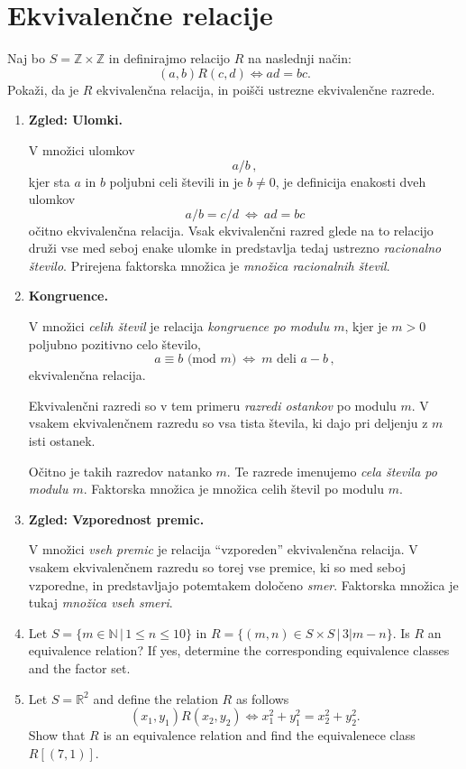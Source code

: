 \documentclass[11pt,paper=b5,footinclude,headinclude]{scrbook} %
\def\cee {{~\Leftrightarrow~}}
\newtheorem{ex}{Vaja\hypertarget{sol:\theex}}[chapter]
\begin{document}
\section{Ekvivalenčne relacije}
\begin{ex}
    Naj bo $S = \mathbb{Z}\times \mathbb{Z}$ in definirajmo relacijo $R$ na naslednji način:  
$$(a,b)R(c,d)\Leftrightarrow ad = bc.$$  
Pokaži, da je $R$ ekvivalenčna relacija, in poišči ustrezne ekvivalenčne razrede.

\end{ex}
\begin{enumerate}
  \item \textbf{Zgled: Ulomki.}

  V množici ulomkov $$a/b\,,$$
  kjer sta $a$ in $b$ poljubni celi števili in je $b\neq 0$, je definicija enakosti dveh ulomkov
  $$a/b = c/d \cee ad = bc$$
  očitno ekvivalenčna relacija. Vsak ekvivalenčni razred glede na to relacijo druži vse med seboj enake ulomke in predstavlja tedaj ustrezno {\em racionalno število}. Prirejena faktorska množica je {\em množica racionalnih števil}.
  \item \textbf{ Kongruence.}


  V množici {\em celih števil} je relacija {\em kongruence po modulu $m$}, kjer je $m> 0$ poljubno pozitivno celo število, $$a\equiv b \textrm{ (mod $m$)}\cee m \textrm{ deli }a-b\,,$$
  ekvivalenčna relacija.

  Ekvivalenčni razredi so v tem primeru {\em razredi ostankov} po modulu $m$. V vsakem ekvivalenčnem razredu so vsa tista števila, ki dajo pri deljenju z $m$ isti ostanek.

  Očitno je takih razredov natanko $m$. Te razrede imenujemo {\em cela števila po modulu $m$}. Faktorska množica je množica celih števil po modulu $m$.

  \item \textbf{Zgled: Vzporednost premic.}

V množici {\em vseh premic} je relacija ``vzporeden'' ekvivalenčna relacija. V vsakem ekvivalenčnem razredu so torej vse premice, ki so med seboj vzporedne, in predstavljajo potemtakem določeno {\em smer}. Faktorska množica je tukaj {\em množica vseh smeri}.



\item Let $S= \{m\in \mathbb{N}\,|\, 1\leq n \leq 10\}$ in $R=\{(m,n)\in S\times S\,|\, 3|m-n\}$.
Is $R$ an equivalence relation? If yes, determine the corresponding equivalence classes and the factor set.


\item Let  $S =  \mathbb{R}^2$ and define the relation $R$ as follows
$$(x_1,y_1)R(x_2,y_2)\Leftrightarrow x_1^2 + y_1^2 = x_2^2 + y_2^2.$$
Show that $R$ is an equivalence relation  and find the equivalenece class $R[(7,1)]$.

\end{enumerate}
\end{document}
